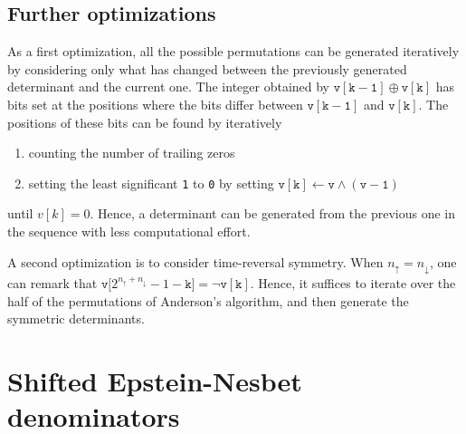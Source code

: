 \documentclass[aip,jcp,reprint,showkeys]{revtex4-1}
\newcommand{\up}{\uparrow}
\newcommand{\dn}{\downarrow}
\newcommand{\one}{{\texttt{1}}}
\newcommand{\zero}{{\texttt{0}}}
\newcommand{\csf}{\textsc{csf}}
\begin{document}
\subsection{Further optimizations}

As a first optimization, all the possible permutations can be generated
iteratively by considering only what has changed between the previously
generated determinant and the current one.
The integer obtained by $\mathtt{v[k-1]} \oplus \mathtt{v[k]}$ has bits set at
the positions where the bits differ between $\mathtt{v[k-1]}$ and
$\mathtt{v[k]}$. The positions of these bits can be found by iteratively
\begin{enumerate}
\item counting the number of trailing zeros
\item setting the least significant {\one} to {\zero} by setting
      $\mathtt{v[k] \gets v \wedge (v-1)}$
\end{enumerate}
until $v[k] = 0$. Hence, a determinant can be generated from the previous
one in the sequence with less computational effort.

A second optimization is to consider time-reversal symmetry. When $n_\up =
n_\dn$, one can remark that $\mathtt{v[}2^{n_\up+n_\dn}-1-\mathtt{k]} = \neg \mathtt{v[k]}$.
Hence, it suffices to iterate over the half of the permutations of Anderson's
algorithm, and then generate the symmetric determinants.

\section{Shifted Epstein-Nesbet denominators}

\end{document}
